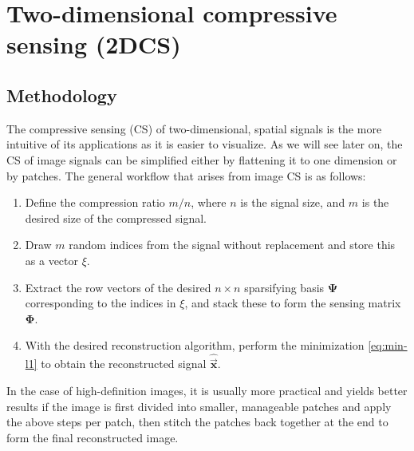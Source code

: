 \chapter{Two-dimensional compressive sensing (2DCS)}
\label{chap:2dcs}

\section{Methodology}
\label{sec:2dmetho}
The compressive sensing (CS) of two-dimensional, spatial signals is the more intuitive of its applications as it is easier to visualize. As we will see later on, the CS of image signals can be simplified either by flattening it to one dimension or by patches. The general workflow that arises from image CS is as follows:

\begin{enumerate}
	\item Define the compression ratio $m/n$, where $n$ is the signal size, and $m$ is the desired size of the compressed signal.
	\item Draw $m$ random indices from the signal without replacement and store this as a vector $\xi$.
	\item Extract the row vectors of the desired $n \times n$ sparsifying basis $\bm\Psi$ corresponding to the indices in $\xi$, and stack these to form the sensing matrix $\bm\Phi$.
	\item With the desired reconstruction algorithm, perform the minimization \eqref{eq:min-l1} to obtain the reconstructed signal $\bm\hat{\vec{x}}$.
\end{enumerate}

In the case of high-definition images, it is usually more practical and yields better results if the image is first divided into smaller, manageable patches and apply the above steps per patch, then stitch the patches back together at the end to form the final reconstructed image.



